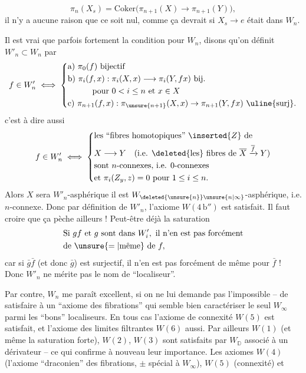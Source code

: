 
\[\pi_n(X_s)=\mathrm{Coker}\bigl(\pi_{n+1}(X)\longrightarrow\pi_{n+1}(Y)\bigr),\] il n'y a aucune raison que ce soit nul, comme ça devrait si $X_s\longrightarrow e$ était dans $W_n$.

Il est vrai que parfois   fortement la condition pour $W_n$, disons qu'on définit $W'_n\subset W_n$ par \[f\in W'_n\iff\left\{\begin{aligned}&\mathrm a)\ \pi_0(f)\text{ bijectif}\\&\mathrm b)\ \pi_i(f,x):\pi_i(X,x)\longrightarrow\pi_i(Y,fx)\text{ bij.}\\&\hspace{3em}\text{pour }0<i\leq n\text{ et }x\in X\\&\mathrm c)\ \pi_{n+1}(f,x):\pi_{\unsure{n+1}}(X,x)\to\pi_{n+1}(Y,fx)\ \text{\uline{surj}}.\end{aligned}\right.\] c'est à dire aussi \[f\in W'_n\iff\left\{\begin{aligned}&\text{les ``fibres homotopiques''}\ \inserted{Z}\ \text{de}\\ &X\longrightarrow Y\quad(\text{i.e. }\deleted{\text{les}}\text{ fibres de }\overline X\xrightarrow{\overline f}Y)\\ &\text{sont }n\text{-connexes, i.e. 0-connexes}\\ &\text{et }\pi_i(Z_y,z)=0\text{ pour }1\leq i\leq n.\end{aligned}\right.\] Alors $X$  sera $W'_n$-asphérique  il est $W_{\deleted{\unsure{n}}\unsure{n|\infty}}$-asphérique, i.e. $n$-connexe. Donc par  définition de $W'_n$, l'axiome $W(4\,\mathrm b'')$ est satisfait. Il faut croire que ça pèche ailleurs ! Peut-être déjà la saturation \[ \begin{aligned}&\text{Si }gf\text{ et }g\text{ sont dans }W'_i,\text{ il n'en est pas forcément}\\ &\text{de }\unsure{=|\text{même}}\text{ de }f,\end{aligned}\] car si $\bar g\bar f$ (et  donc $\bar g$) est surjectif, il n'en est pas forcément de même pour $\bar f$ ! Donc $W'_n$ ne mérite pas le nom de ``localiseur''.

Par contre, $W_n$ me paraît excellent, si on ne lui demande pas l'impossible -- de satisfaire à un ``axiome des fibrations'' qui semble bien  caractériser le seul $W_\infty$ parmi les ``bons'' localiseurs. En tous cas l'axiome de connexité $W(5)$ est satisfait, et l'axiome des limites filtrantes $W(6)$ aussi. Par ailleurs $W(1)$  (et même la saturation forte), $W(2)$, $W(3)$\deleted{\unsure{,}} sont satisfaits par  $W_{\mathbb D}$ associé à un dérivateur -- ce qui confirme à nouveau leur importance. Les axiomes $W(4)$ (l'axiome ``draconien'' des fibrations, $\pm$ spécial à $W_\infty$), $W(5)$ (connexité) et

